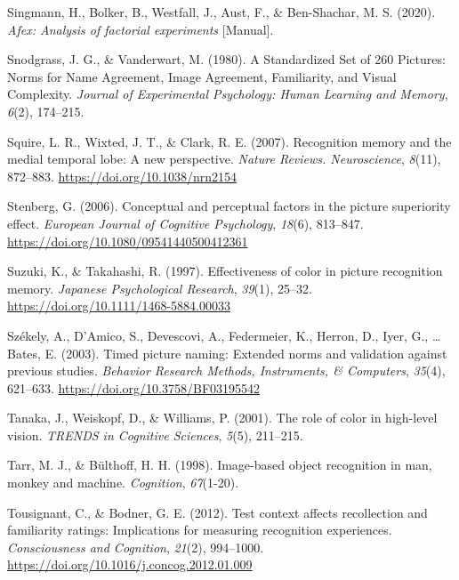 \documentclass[
  11pt,
]{article}
\begin{document}
\leavevmode\hypertarget{ref-afex}{}%
Singmann, H., Bolker, B., Westfall, J., Aust, F., \& Ben-Shachar, M. S.
(2020). \emph{Afex: Analysis of factorial experiments} {[}Manual{]}.

\leavevmode\hypertarget{ref-snodgrass1980}{}%
Snodgrass, J. G., \& Vanderwart, M. (1980). A Standardized Set of 260
Pictures: Norms for Name Agreement, Image Agreement, Familiarity, and
Visual Complexity. \emph{Journal of Experimental Psychology: Human
Learning and Memory}, \emph{6}(2), 174--215.

\leavevmode\hypertarget{ref-squire2007}{}%
Squire, L. R., Wixted, J. T., \& Clark, R. E. (2007). Recognition memory
and the medial temporal lobe: A new perspective. \emph{Nature Reviews.
Neuroscience}, \emph{8}(11), 872--883.
\url{https://doi.org/10.1038/nrn2154}

\leavevmode\hypertarget{ref-stenberg2006}{}%
Stenberg, G. (2006). Conceptual and perceptual factors in the picture
superiority effect. \emph{European Journal of Cognitive Psychology},
\emph{18}(6), 813--847. \url{https://doi.org/10.1080/09541440500412361}

\leavevmode\hypertarget{ref-suzuki1997}{}%
Suzuki, K., \& Takahashi, R. (1997). Effectiveness of color in picture
recognition memory. \emph{Japanese Psychological Research},
\emph{39}(1), 25--32. \url{https://doi.org/10.1111/1468-5884.00033}

\leavevmode\hypertarget{ref-szekely2003}{}%
Székely, A., D'Amico, S., Devescovi, A., Federmeier, K., Herron, D.,
Iyer, G., \ldots{} Bates, E. (2003). Timed picture naming: Extended
norms and validation against previous studies. \emph{Behavior Research
Methods, Instruments, \& Computers}, \emph{35}(4), 621--633.
\url{https://doi.org/10.3758/BF03195542}

\leavevmode\hypertarget{ref-tanaka2001}{}%
Tanaka, J., Weiskopf, D., \& Williams, P. (2001). The role of color in
high-level vision. \emph{TRENDS in Cognitive Sciences}, \emph{5}(5),
211--215.

\leavevmode\hypertarget{ref-tarr1998}{}%
Tarr, M. J., \& Bülthoff, H. H. (1998). Image-based object recognition
in man, monkey and machine. \emph{Cognition}, \emph{67}(1-20).

\leavevmode\hypertarget{ref-tousignant2012}{}%
Tousignant, C., \& Bodner, G. E. (2012). Test context affects
recollection and familiarity ratings: Implications for measuring
recognition experiences. \emph{Consciousness and Cognition},
\emph{21}(2), 994--1000.
\url{https://doi.org/10.1016/j.concog.2012.01.009}
\end{document}
